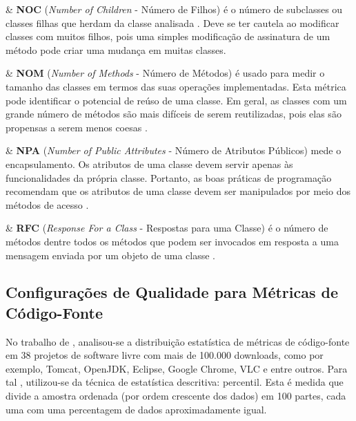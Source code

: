 \begin{easylist}
	& \textbf{NOC} (\textit{Number of Children} - Número de Filhos)
	é o número de subclasses ou classes filhas que herdam da classe analisada 
	\cite{Rosenberg97}. Deve se ter cautela ao modificar classes com muitos 
	filhos, pois uma simples modificação de assinatura de um método pode criar
	uma mudança em muitas classes.


	& \textbf{NOM} (\textit{Number of Methods} - Número de Métodos) é usado 
	para medir o tamanho das classes em termos das suas operações 
	implementadas. Esta métrica pode identificar o 
	potencial de reúso de uma classe. Em geral, as classes com um grande 
	número de métodos são mais difíceis de serem reutilizadas, pois elas 
	são propensas a serem menos coesas \cite{Lorenz94}.
	

	& \textbf{NPA} (\textit{Number of Public Attributes} - Número de Atributos Públicos) mede o encapsulamento. Os atributos de uma classe devem servir apenas às funcionalidades da própria classe. Portanto, as boas práticas de programação recomendam que os atributos de uma classe devem ser manipulados por meio dos métodos de acesso \cite{beck1997smalltalk}.



	& \textbf{RFC} (\textit{Response For a Class} - Respostas para uma 
	Classe) é o número de métodos dentre todos os métodos que podem ser invocados 
	em resposta a uma mensagem enviada por um objeto de uma classe 
	\cite{Sharble93}.





\end{easylist}
	
\subsection{Configurações de Qualidade para Métricas de Código-Fonte}
\label{sec:Intervalos das Métricas}

No trabalho de , analisou-se a distribuição estatística de métricas de código-fonte em 38 projetos de software livre com mais de 100.000 downloads, como por exemplo, Tomcat, OpenJDK, Eclipse, Google Chrome, VLC e entre outros. Para tal , utilizou-se da técnica de estatística descritiva: percentil. Esta é medida que divide a amostra ordenada (por ordem crescente dos dados) em 100 partes, cada uma com uma percentagem de dados aproximadamente igual. 

